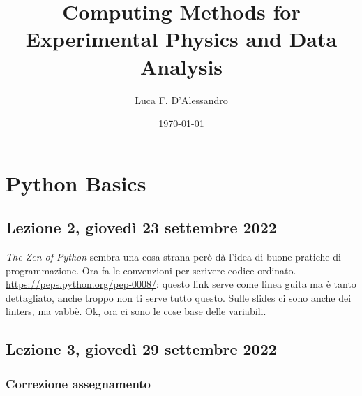 \documentclass[10pt, a4paper, titlepage]{book}
\title{Computing Methods for Experimental Physics and Data Analysis}
\author{Luca F. D'Alessandro}
\date{\today}
\begin{document}
\maketitle

\tableofcontents

\chapter{Python Basics}

\section{Lezione 2, giovedì 23 settembre 2022}

\emph{The Zen of Python} sembra una cosa strana però dà l'idea di buone pratiche di programmazione.
Ora fa le convenzioni per scrivere codice ordinato.
\url{https://peps.python.org/pep-0008/}:
questo link serve come linea guita ma è tanto dettagliato, anche troppo non ti serve tutto questo.
Sulle slides ci sono anche dei linters, ma vabbè.
Ok, ora ci sono le cose base delle variabili.


\section{Lezione 3, giovedì 29 settembre 2022}

\subsection{Correzione assegnamento}
\end{document}
